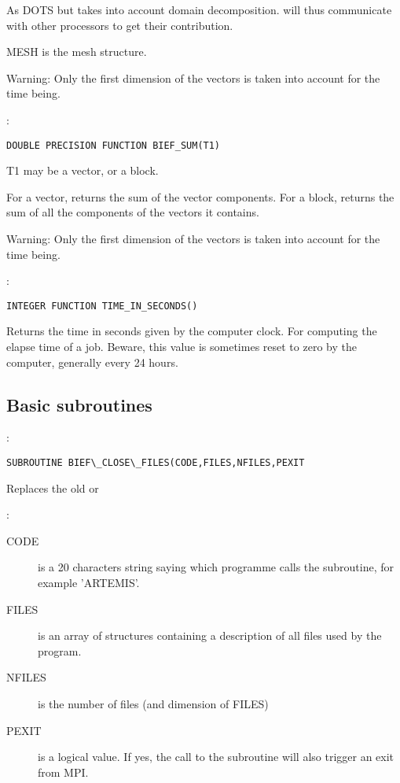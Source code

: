 As DOTS but takes into account domain decomposition.  will thus
communicate with other processors to get their contribution.

MESH is the mesh structure.

\begin{WarningBlock}{Warning:}
Only the first dimension of the vectors is taken into account for the time being.
\end{WarningBlock}

:
\begin{lstlisting}[language=TelFortran]
DOUBLE PRECISION FUNCTION BIEF_SUM(T1)
\end{lstlisting}

T1 may be a vector, or a block.

For a vector, returns the sum of the vector components. For a block, returns
the sum of all the components of the vectors it contains.

\begin{WarningBlock}{Warning:}
Only the first dimension of the vectors is taken into account for the time being.
\end{WarningBlock}

:
\begin{lstlisting}[language=TelFortran]
INTEGER FUNCTION TIME_IN_SECONDS()
\end{lstlisting}

Returns the time in seconds given by the computer clock. For computing the
elapse time of a job. Beware, this value is sometimes reset to zero by the
computer, generally every 24 hours.

\subsection{Basic subroutines}

:
\begin{lstlisting}[language=TelFortran]
SUBROUTINE BIEF\_CLOSE\_FILES(CODE,FILES,NFILES,PEXIT
\end{lstlisting}

Replaces the old  or 

:
\begin{description}
  \item [CODE] is a 20 characters string saying which programme calls the
    subroutine, for example 'ARTEMIS'.
  \item [FILES] is an array of  structures containing a
    description of all files used by the program.
  \item [NFILES] is the number of files (and dimension of FILES)
  \item [PEXIT] is a logical value. If yes, the call to the subroutine will
    also trigger an exit from MPI.
\end{description}

